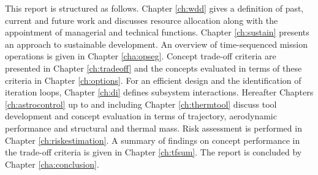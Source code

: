 This report is structured as follows. Chapter \ref{ch:wdd} gives a definition of past, current and future work and discusses resource allocation along with the appointment of managerial and technical functions. Chapter \ref{ch:sustain} presents an approach to sustainable development. An overview of time-sequenced mission operations is given in Chapter \ref{cha:opseg}. Concept trade-off criteria are presented in Chapter \ref{ch:tradeoff} and the concepts evaluated in terms of these criteria in Chapter \ref{ch:options}. For an efficient design and the identification of iteration loops, Chapter \ref{ch:di} defines subsystem interactions. Hereafter Chapters \ref{ch:astrocontrol} up to and including Chapter \ref{ch:thermtool} discuss tool development and concept evaluation in terms of trajectory, aerodynamic performance and structural and thermal mass. Risk assessment is performed in Chapter \ref{ch:riskestimation}. A summary of findings on concept performance in the trade-off criteria is given in Chapter \ref{ch:tfsum}. The report is concluded by Chapter \ref{cha:conclusion}.





